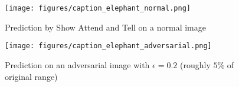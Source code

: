 \begin{figure*}[ht]
    \centering
    \begin{minipage}{0.45\textwidth}
        \centering
        \texttt{[image: figures/caption\_elephant\_normal.png]} %
        \caption{Prediction by Show Attend and Tell on a normal image}
    \end{minipage}\hfill
    \begin{minipage}{0.45\textwidth}
        \centering
        \texttt{[image: figures/caption\_elephant\_adversarial.png]} %
        \caption{Prediction on an adversarial image with $\epsilon=0.2$ (roughly $5\%$ of original range)}
    \end{minipage}
\end{figure*}